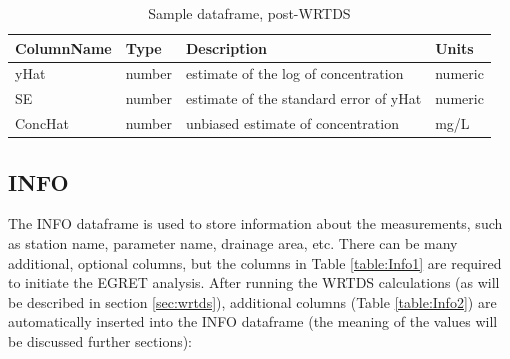 \documentclass[a4paper,11pt]{article}\usepackage{graphicx, color}
\begin{document}
\begin{table}[!ht]
\centering
\caption{Sample dataframe, post-WRTDS} 
\label{table:Sample2}
\begin{tabular}{llll}
  \hline
ColumnName & Type & Description & Units \\ 
  \hline
yHat\footnotemark[2] & number & estimate of the log of concentration & numeric \\ 
  SE\footnotemark[2] & number & estimate of the standard error of yHat & numeric \\ 
  ConcHat\footnotemark[2] & number & unbiased estimate of concentration & mg/L \\ 
   \hline
\end{tabular}
\end{table}


\FloatBarrier
\pagebreak


\subsection{INFO}
\label{sec:dataframesINFO}
The INFO dataframe is used to store information about the measurements, such as station name, parameter name, drainage area, etc. There can be many additional, optional columns, but the columns in Table \ref{table:Info1} are required to initiate the EGRET analysis. After running the WRTDS calculations (as will be described in section \ref{sec:wrtds}), additional columns (Table \ref{table:Info2}) are automatically inserted into the INFO dataframe (the meaning of the values will be discussed further sections):
\end{document}

